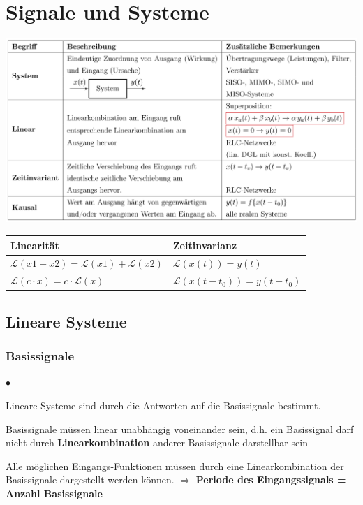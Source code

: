 \section{Signale und Systeme}
	
	\includegraphics[width=\textwidth]{./bilder/LTISystem.png}\\

	\begin{tabular}{|l|l|}
    	\hline
    	\textbf{Linearität} & \textbf{Zeitinvarianz}\\
    	\hline
    	$\mathcal{L}(x1+x2)=\mathcal{L}(x1)+\mathcal{L}(x2)$ & $\mathcal{L}(x(t)) = y(t)$ \\
    	$\mathcal{L}(c\cdot x)=c\cdot \mathcal{L}(x)$ & $\mathcal{L}(x(t-t_0)) = y(t-t_0)$ \\
		\hline    
    \end{tabular}
  			
		
	\subsection{Lineare Systeme}
  
		\subsubsection{Basissignale}
			\begin{list}{$\bullet$}{\setlength{\itemsep}{0cm} \setlength{\parsep}{0cm} \setlength{\topsep}{0cm}} 
	          \item Lineare Systeme sind durch die Antworten auf die
	          Basissignale bestimmt.
	          \item Basissignale müssen linear unabhängig voneinander sein, d.h. ein
			Basissignal darf nicht durch \textbf{Linearkombination} anderer Basissignale
			darstellbar sein          
			  \item Alle möglichen Eingangs-Funktionen müssen durch eine Linearkombination der
			Basissignale dargestellt werden können. $\Rightarrow$ \textbf{Periode des Eingangssignals =	Anzahl Basissignale}
	        \end{list}
	        \vspace{.2cm}
        

